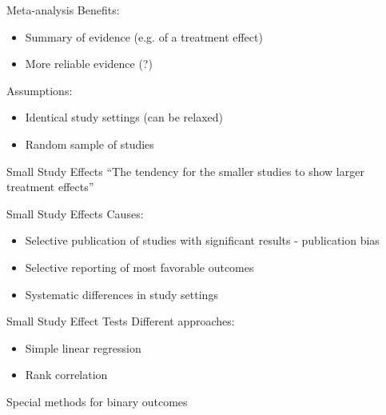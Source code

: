 \documentclass[english]{beamer}\usepackage[]{graphicx}\usepackage[]{color}
\begin{document}
\begin{frame}{Meta-analysis}
Benefits:
\begin{itemize}
\item Summary of evidence (e.g. of a treatment effect)
\item More reliable evidence (?)
\end{itemize}

Assumptions:
\begin{itemize}
\item Identical study settings (can be relaxed)
\item Random sample of studies
\end{itemize}
\end{frame}




\begin{frame}{Small Study Effects}
``The tendency for the smaller studies to show larger treatment effects'' \citep{Sterne}
\end{frame}


\begin{frame}{Small Study Effects}
Causes:
\begin{itemize}
\item Selective publication of studies with significant results - publication bias
\item Selective reporting of most favorable outcomes
\item Systematic differences in study settings
\end{itemize}
\end{frame}


\begin{frame}{Small Study Effect Tests}
Different approaches:
\begin{itemize}
\item Simple linear regression
\item Rank correlation
\end{itemize}

Special methods for binary outcomes	
\end{frame}
\end{document}
